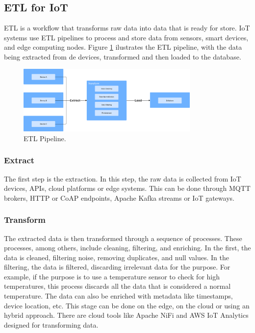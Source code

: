 \subsection{ETL for IoT}
\gls{ETL} is a workflow that transforms raw data into data that is ready for
store. \gls{IoT} systems use \gls{ETL} pipelines to process and store data from sensors,
smart devices, and edge computing nodes. Figure \ref{fig:etl:pipeline}
ilustrates the \gls{ETL} pipeline, with the data being extracted from de devices,
transformed and then loaded to the database\cite{singu2022etl}.

\begin{figure}[htbp]
	\centering
	\includegraphics[width=0.8\textwidth, height=0.5\textheight, keepaspectratio]{Chapters/Figures/ETL/ETL.pdf}
	\caption{\gls{ETL} Pipeline.}
	\label{fig:etl:pipeline}
\end{figure}

\subsubsection{Extract}
The first step is the extraction. In this step, the raw data is collected from
\gls{IoT} devices, \gls{API}s, cloud platforms or edge systems. This can be done through
\gls{MQTT} brokers, \gls{HTTP} or \gls{CoAP} endpoints, Apache Kafka streams or \gls{IoT} gateways.

\subsubsection{Transform}
The extracted data is then transformed through a sequence of processes. These
processes, among others, include cleaning, filtering, and enriching.
In the first, the data is cleaned, filtering noise, removing duplicates, and
null values. In the filtering, the data is filtered, discarding irrelevant data
for the purpose. For example, if the purpose is to use a temperature sensor to
check for high temperatures, this process discards all the data that is
considered a normal temperature. The data can also be enriched with metadata
like timestamps, device location, etc\cite{singu2022etl}. This stage can be done on the edge, on
the cloud or using an hybrid approach. There are cloud tools like Apache NiFi
and \gls{AWS} \gls{IoT} Analytics designed for transforming data.

